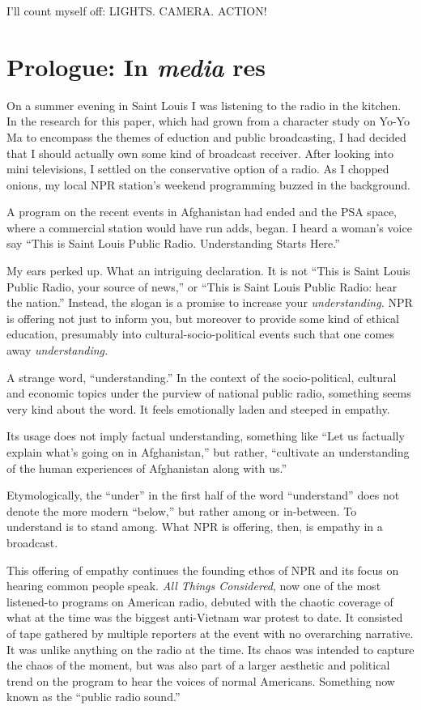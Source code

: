 \documentclass[12pt,letterpaper]{article}
\begin{document}
	I'll count myself off: LIGHTS. CAMERA. ACTION!	

	\newpage	
	\section*{Prologue: In \textit{media} res}
	
	\noindent
	On a summer evening in Saint Louis I was listening to the radio in
	the kitchen. In the research for this paper, which had grown from a 
	character
	study on Yo-Yo Ma to encompass the themes of eduction and public 
	broadcasting,
	I had decided that I should actually own some kind of broadcast 
	receiver. 
	After looking into mini televisions, I settled on the conservative 
	option
	of a radio. As I chopped onions, my local NPR station's weekend 
	programming
	buzzed in the background.
	
	A program on the recent events in Afghanistan had ended and the PSA 
	space, where a commercial station
	would have run adds, began. I heard a woman's voice say ``This is Saint
	Louis Public Radio. Understanding Starts Here.'' 

	My ears perked up. What an intriguing declaration. It is not ``This is 
	Saint Louis Public Radio, your source of news,'' or ``This is Saint 
	Louis Public Radio: hear the nation.'' Instead, the 
	slogan is a 
	promise to increase your \textit{understanding. }NPR is offering not
	just to 
	inform you, but moreover to provide some kind of ethical education,
	presumably into cultural-socio-political events such that one comes away
	\textit{understanding.}

	A strange word, ``understanding.'' In the context of the 
	socio-political,
	cultural and economic topics under the purview of national public 
	radio, something seems very kind about the word. It feels emotionally
	laden and steeped in empathy. 

	Its usage does not imply factual understanding, something like ``Let
	us factually explain what's going on in Afghanistan,'' but rather, 
	``cultivate an understanding of the human experiences of Afghanistan 
	along with us.'' 


	Etymologically, the ``under'' in the first half of the word 
	``understand'' does not denote the more modern ``below,'' but rather 
	among or in-between. \autocite{Ety} To understand is to stand among. 
	What NPR is offering, then, is empathy in a broadcast. 


	This offering of empathy continues the founding ethos of NPR 
	and its focus on hearing common people speak. 
	\textit{All Things Considered}, now one of the most listened-to programs
	on American radio, debuted with the chaotic coverage of
	what at the time was the biggest anti-Vietnam war protest to date. It
	consisted of tape gathered by multiple reporters at the event with no 
	overarching narrative. It was unlike anything on the radio at the time.
	Its chaos was intended to capture the chaos of the moment, but was also
	part of a larger aesthetic and political trend on the program to hear 
	the voices of normal Americans. Something now known as the 
	``public radio sound.'' 
\end{document}
